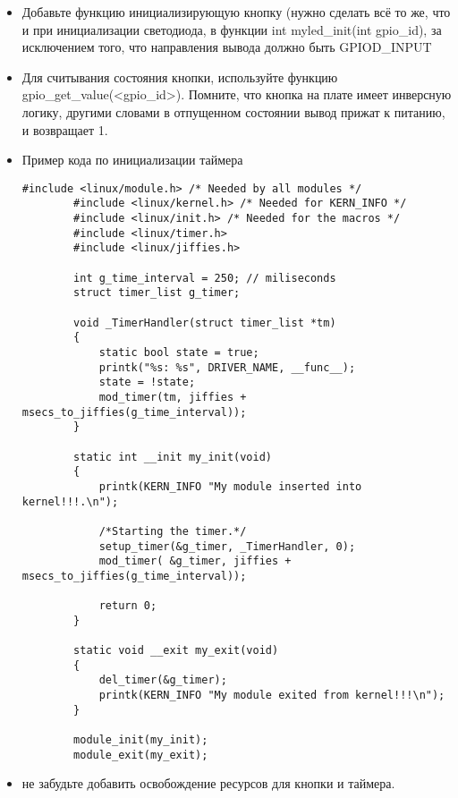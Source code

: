 \begin{itemize}
	\item Добавьте функцию инициализирующую кнопку (нужно сделать всё то же, что и при инициализации светодиода, в функции int myled\_init(int gpio\_id), за исключением того, что направления вывода должно быть GPIOD\_INPUT
	
	\item Для считывания состояния кнопки, используйте функцию gpio\_get\_value(<gpio\_id>). Помните, что кнопка на плате имеет инверсную логику, другими словами в отпущенном состоянии вывод прижат к питанию, и возвращает 1.
	
	\item Пример кода по инициализации таймера
	\begin{lstlisting}[style=stdout]
		      #include <linux/module.h> /* Needed by all modules */
		#include <linux/kernel.h> /* Needed for KERN_INFO */
		#include <linux/init.h> /* Needed for the macros */
		#include <linux/timer.h>
		#include <linux/jiffies.h>
		
		int g_time_interval = 250; // miliseconds
		struct timer_list g_timer;
		
		void _TimerHandler(struct timer_list *tm)
		{
			static bool state = true;
			printk("%s: %s", DRIVER_NAME, __func__);
			state = !state;
			mod_timer(tm, jiffies + msecs_to_jiffies(g_time_interval));
		}
		
		static int __init my_init(void)
		{
			printk(KERN_INFO "My module inserted into kernel!!!.\n");
			
			/*Starting the timer.*/
			setup_timer(&g_timer, _TimerHandler, 0);
			mod_timer( &g_timer, jiffies + msecs_to_jiffies(g_time_interval));
			
			return 0;
		}
		
		static void __exit my_exit(void)
		{
			del_timer(&g_timer);
			printk(KERN_INFO "My module exited from kernel!!!\n");
		}
		
		module_init(my_init);
		module_exit(my_exit);
	\end{lstlisting}

	\item не забудьте добавить освобождение ресурсов для кнопки и таймера.
\end{itemize}